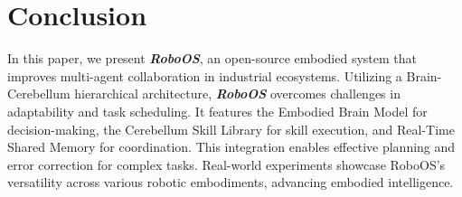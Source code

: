\section{Conclusion}
\label{sec:conclusion}
In this paper, we present \textbf{\textit{RoboOS}}, an open-source embodied system that improves multi-agent collaboration in industrial ecosystems. Utilizing a Brain-Cerebellum hierarchical architecture, \textbf{\textit{RoboOS}} overcomes challenges in adaptability and task scheduling. It features the Embodied Brain Model for decision-making, the Cerebellum Skill Library for skill execution, and Real-Time Shared Memory for coordination. This integration enables effective planning and error correction for complex tasks. Real-world experiments showcase RoboOS's versatility across various robotic embodiments, advancing embodied intelligence.